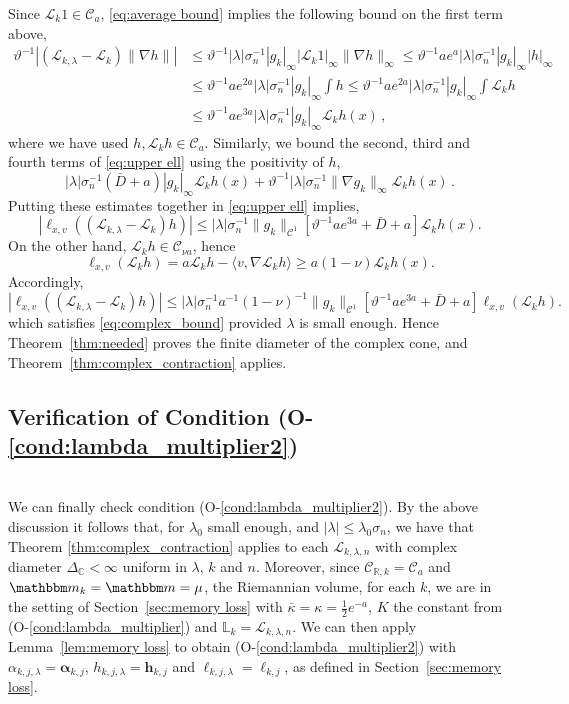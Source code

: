 \documentclass{amsart}
\numberwithin{equation}{section}
\newcommand\cC{{\mathcal C}}
\newcommand\cL{{\mathcal L}}
\newcommand\bC{{\mathbb C}}
\newcommand\bL{{\mathbb L}}
\newcommand\bR{{\mathbb R}}
\newcommand{\bbm}{\mathbbm m}
\begin{document}
Since $\cL_k 1\in\cC_a$, \eqref{eq:average bound} implies
the following bound on the first term above, 
\[
\begin{split}
\vartheta^{-1} \left|(\cL_{k,\lambda}-\cL_k) \| \nabla h \| \right|
& \leq \vartheta^{-1} |\lambda| \sigma_n^{-1}  | g_k |_\infty |\cL_k 1 |_\infty \| \nabla h \|_\infty
\leq \vartheta^{-1} a e^a |\lambda| \sigma_n^{-1} |g_k|_\infty | h |_\infty \\
& \le \vartheta^{-1} a e^{2a} |\lambda| \sigma_n^{-1} |g_k|_\infty \int h 
\le \vartheta^{-1} a e^{2a} |\lambda| \sigma_n^{-1} |g_k|_\infty \int \cL_k h \\
& \le \vartheta^{-1} a e^{3a} |\lambda| \sigma_n^{-1} |g_k|_\infty \cL_k h(x) \, ,
\end{split}
\]
where we have used $h, \cL_k h \in \cC_a$.  Similarly, we bound the second, third and fourth terms
of \eqref{eq:upper ell} using the positivity of $h$,
\[
|\lambda| \sigma_n^{-1} (\bar D + a) |g_k|_\infty \cL_k h(x) + \vartheta^{-1} | \lambda| \sigma_n^{-1} \| \nabla g_k \|_\infty \cL_kh(x) \, .
\]
Putting these estimates together in \eqref{eq:upper ell} implies,
\[
\left|\ell_{x,v}\left((\cL_{k,\lambda}-\cL_k) h\right)\right|
\leq |\lambda| \sigma_n^{-1} \| g_k\|_{\cC^1} \left[ \vartheta^{-1} ae^{3a} + \bar D +a \right]\cL_kh (x). 
\]
On the other hand, $\cL_k h\in\cC_{\nu a}$, hence 
\[
\ell_{x,v}(\cL_k h)=a\cL_k h-\langle v, \nabla \cL_k h\rangle\geq a(1-\nu)\cL_k h(x).
\]
Accordingly,
\[
\left|\ell_{x,v}\left((\cL_{k,\lambda}-\cL_k) h\right)\right|\leq 
|\lambda| \sigma_n^{-1} a^{-1}(1-\nu)^{-1} \| g_k\|_{\cC^1}\left[ \vartheta^{-1} a e^{3a}+ \bar D +a \right]\ell_{x,v}(\cL_k h).
\]
which satisfies  \eqref{eq:complex_bound} provided $\lambda$ is small enough. Hence Theorem~\ref{thm:needed} proves the finite diameter of the complex cone, and Theorem~\ref{thm:complex_contraction} applies.

\subsection{Verification of Condition (O-\ref{cond:lambda_multiplier2})}\ \\
\label{sec:checkO3}
We can finally check condition (O-\ref{cond:lambda_multiplier2}).
By the above discussion it follows that, for $\lambda_0$ small enough, and $|\lambda|\leq \lambda_0\sigma_n$, we have that Theorem \ref{thm:complex_contraction}  applies to each $\cL_{k,\lambda, n}$ with complex diameter $\Delta_{\bC}< \infty$ uniform in $\lambda$, $k$ and $n$. 
Moreover, since $\cC_{\bR, k} = \cC_a$ and $\bbm_k = \bbm = \mu$, the Riemannian volume,
for each $k$, we are in the setting of Section~\ref{sec:memory loss} with $\bar\kappa = \kappa = \frac 12 e^{-a}$, $K$ the constant from (O-\ref{cond:lambda_multiplier}) and $\bL_k = \cL_{k, \lambda, n}$.
We can then apply Lemma~\ref{lem:memory loss} to obtain (O-\ref{cond:lambda_multiplier2}) with
$\alpha_{k,j,\lambda} = \boldsymbol{\alpha}_{k,j}$, $h_{k,j,\lambda} = \boldsymbol{h}_{k,j}$
and $\ell_{k,j,\lambda} = \boldsymbol{\ell}_{k,j}$, as defined in Section~\ref{sec:memory loss}.
\end{document}
